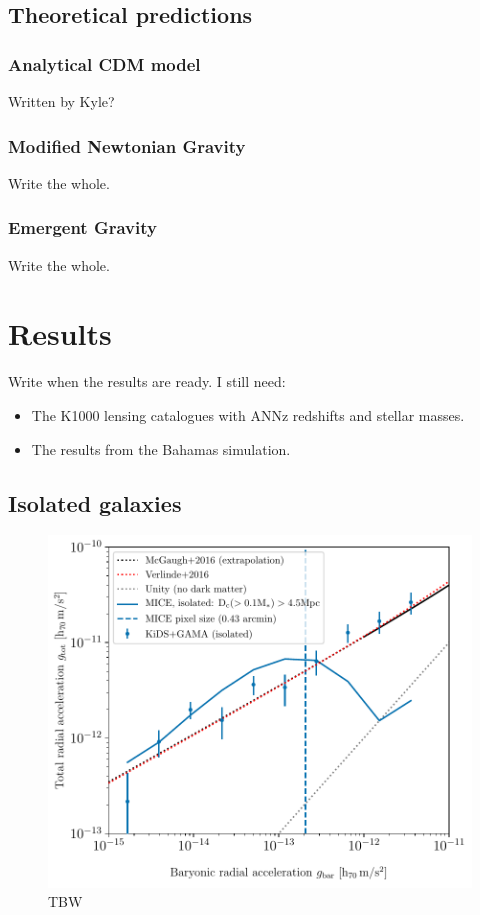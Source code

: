 \documentclass[fleqn,usenatbib]{mnras}
\begin{document}
\subsection{Theoretical predictions}
\label{sec:predictions}

\subsubsection{Analytical CDM model}
\label{sec:analytical}
Written by Kyle?

\subsubsection{Modified Newtonian Gravity}
\label{sec:MOND}
Write the whole.

\subsubsection{Emergent Gravity}
\label{sec:EG}
Write the whole.

\section{Results}
\label{sec:results}
Write when the results are ready.
I still need:
\begin{itemize}
	\item The K1000 lensing catalogues with ANNz redshifts and stellar masses.
	\item The results from the Bahamas simulation.
\end{itemize}

\subsection{Isolated galaxies}

\begin{figure}
	\includegraphics[width=1.0\columnwidth]{Figures/RAR_GAMA+MICE_isolated_strong.pdf}
	\caption{TBW}
\end{figure}
\end{document}
